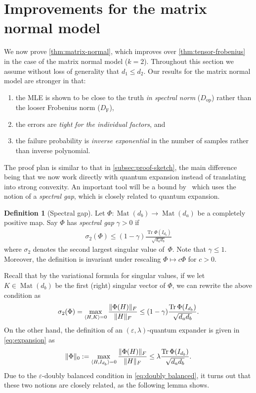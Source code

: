 \documentclass[aos]{imsart}
\theoremstyle{definition}
\newtheorem{definition}[theorem]{Definition}
\numberwithin{equation}{section}
\DeclareMathOperator{\Mat}{Mat}
\DeclareMathOperator{\tr}{Tr}
\DeclarePairedDelimiter{\norm}{\lVert}{\rVert}
\newcommand{\eps}{\varepsilon}
\newcommand{\DF}{D_{\operatorname{F}}}
\newcommand{\Dop}{D_{\operatorname{op}}}
\begin{document}
\section{Improvements for the matrix normal model}\label{sec:matrix-normal}
We now prove \cref{thm:matrix-normal}, which improves over \cref{thm:tensor-frobenius} in the case of the matrix normal model ($k=2$).
Throughout this section we assume without loss of generality that $d_1 \leq d_2$.
Our results for the matrix normal model are stronger in that:
\begin{enumerate}
\item the MLE is shown to be close to the truth \emph{in spectral norm} ($\Dop$) rather than the looser Frobenius norm ($\DF$),
\item the errors are \emph{tight for the individual factors}, and
\item the failure probability is \emph{inverse exponential} in the number of samples rather than inverse polynomial.
\end{enumerate}

The proof plan is similar to that in \cref{subsec:proof-sketch}, the main difference being that we now work directly with quantum expansion instead of translating into strong convexity.
An important tool will be a bound by~\cite{KLR19} which uses the notion of a \emph{spectral gap}, which is closely related to quantum expansion.

\begin{definition}[Spectral gap]\label{def:gap}
Let $\Phi\colon\Mat(d_b) \to \Mat(d_a)$ be a completely positive map.
Say $\Phi$ has \emph{spectral gap} $\gamma>0$ if
\begin{align}\label{eq:spectral-gap}
  \sigma_2(\Phi) \leq (1 - \gamma) \frac{\tr \Phi(I_{d_b})}{\sqrt{d_a d_b}}
\end{align}
where $\sigma_2$ denotes the second largest singular value of~$\Phi$.
Note that $\gamma\leq1$.
Moreover, the definition is invariant under rescaling $\Phi \mapsto c\Phi$ for $c>0$.
\end{definition}

\noindent

Recall that by the variational formula for singular values, if we let $K \in \Mat(d_{b})$ be the first (right) singular vector of $\Phi$, we can rewrite the above condition as
\begin{align*}
  \sigma_2(\Phi) = \max_{\langle H, K \rangle = 0} \frac{\norm{\Phi(H)}_{F}}{\norm{H}_{F}} \leq (1 - \gamma) \frac{\tr \Phi(I_{d_b})}{\sqrt{d_a d_b}} .
\end{align*}
On the other hand, the definition of an $(\eps,\lambda)$-quantum expander is given in \cref{eq:expansion} as
\begin{align*}
      \norm{\Phi}_0 := \max_{\langle H, I_{d_{b}} \rangle = 0} \frac{\norm{\Phi(H)}_F}{\norm{H}_{F}}
\leq \lambda \frac{\tr \Phi(I_{d_b})}{\sqrt{d_a d_b}}  .
\end{align*}
Due to the $\eps$-doubly balanced condition in \cref{eq:doubly balanced}, it turns out that these two notions are closely related, as the following lemma shows.
\end{document}
